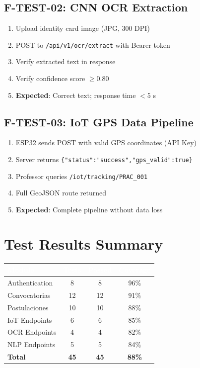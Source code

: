 \documentclass[12pt,a4paper,twoside]{report}
\begin{document}
\subsection{F-TEST-02: CNN OCR Extraction}
\begin{enumerate}[leftmargin=*]
\item Upload identity card image (JPG, 300 DPI)
\item POST to \texttt{/api/v1/ocr/extract} with Bearer token
\item Verify extracted text in response
\item Verify confidence score $\geq 0.80$
\item \textbf{Expected}: Correct text; response time $< 5$ s
\end{enumerate}

\subsection{F-TEST-03: IoT GPS Data Pipeline}
\begin{enumerate}[leftmargin=*]
\item ESP32 sends POST with valid GPS coordinates (API Key)
\item Server returns \texttt{\{"status":"success","gps\_valid":true\}}
\item Professor queries \texttt{/iot/tracking/PRAC\_001}
\item Full GeoJSON route returned
\item \textbf{Expected}: Complete pipeline without data loss
\end{enumerate}

\section{Test Results Summary}
\begin{center}
\begin{tabularx}{\textwidth}{|l|c|c|c|}
\hline
\rowcolor{tableHdr}
\textcolor{white}{\textbf{Module}} & \textcolor{white}{\textbf{Tests}} &
\textcolor{white}{\textbf{Passed}} & \textcolor{white}{\textbf{Coverage}} \\
\hline
\rowcolor{rowOdd}Authentication & 8 & 8 & 96\% \\
\hline\rowcolor{rowEven}Convocatorias & 12 & 12 & 91\% \\
\hline\rowcolor{rowOdd}Postulaciones & 10 & 10 & 88\% \\
\hline\rowcolor{rowEven}IoT Endpoints & 6 & 6 & 85\% \\
\hline\rowcolor{rowOdd}OCR Endpoints & 4 & 4 & 82\% \\
\hline\rowcolor{rowEven}NLP Endpoints & 5 & 5 & 84\% \\
\hline\rowcolor{rowOdd}\textbf{Total} & \textbf{45} & \textbf{45} & \textbf{88\%} \\
\hline
\end{tabularx}
\end{center}
\end{document}
